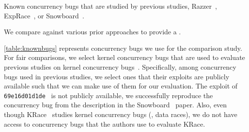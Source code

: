 \begin{table}[t]
  
  \centering
  \caption{Known concurrency bugs that are studied by previous
    studies, Razzer~\cite{razzer}, ExpRace~\cite{exprace}, or
    Snowboard~\cite{snowboard}.}
  \label{table:knownbugs}
\end{table}

We compare \sys against various prior approaches to provide a .

%
\autoref{table:knownbugs} represents concurrency bugs we use for the
comparison study.
%
For fair comparisons, we select kernel concurrency bugs that are used
to evaluate previous studies on kernel concurrency bugs~\cite{exprace,
  razzer, snowboard, krace}. Specifically, among concurrency bugs used
in previous studies, we select ones that their exploits are publicly
available such that we can make use of them for our evaluation.
%
The exploit of \texttt{69e16d01d1de}~\cite{snowboardbug} is not
publicly available, we successfully reproduce the concurrency bug from
the description in the Snowboard~\cite{snowboard} paper.
%
Also, even though KRace~\cite{krace} studies kernel concurrency bugs
(\ie, data races), we do not have access to concurrency bugs that the
authors use to evaluate KRace.

%







